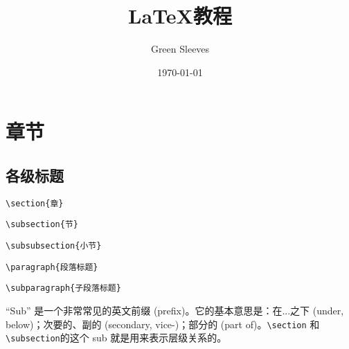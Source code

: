 \documentclass{ctexart}
\title{LaTeX教程}
\author{Green Sleeves}
\date{\today}
\begin{document}
\maketitle %

\newpage
{}  %
\setcounter{page}{1}    %
\tableofcontents %

\newpage %

\section{章节}
\subsection{各级标题}
\lstinline|\section{章}| 

\hspace{2em}\lstinline|\subsection{节}| 

\hspace{4em}\lstinline|\subsubsection{小节}| 

\hspace{6em}\lstinline|\paragraph{段落标题}| 

\hspace{8em}\lstinline|\subparagraph{子段落标题}| 

\vspace{5mm} %

“Sub” 是一个非常常见的英文前缀 (prefix)。它的基本意思是：在...之下 (under, below)；次要的、副的 (secondary, vice-)；部分的 (part of)。\lstinline|\section| 和 \lstinline|\subsection|的这个 sub 就是用来表示层级关系的。
\end{document}
